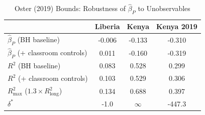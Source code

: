 \begin{table}[htbp]
\centering\small
\caption{Oster (2019) Bounds: Robustness of $\hat{\beta}_P$ to Unobservables}
\label{tab:peer_oster}
\begin{tabular}{lccc}
\toprule
 & Liberia & Kenya & Kenya 2019 \\
\midrule
$\hat{\beta}_P$ (BH baseline) & -0.006 & -0.133 & -0.310 \\
$\hat{\beta}_P$ (+ classroom controls) & 0.011 & -0.160 & -0.319 \\
$R^2$ (BH baseline) & 0.083 & 0.528 & 0.299 \\
$R^2$ (+ classroom controls) & 0.103 & 0.529 & 0.306 \\
$R^2_{\max}$ ($1.3 \times R^2_{\text{long}}$) & 0.134 & 0.688 & 0.397 \\
$\delta^*$ & -1.0 & $\infty$ & -447.3 \\
\bottomrule
\end{tabular}
\par\smallskip{}
\end{table}
